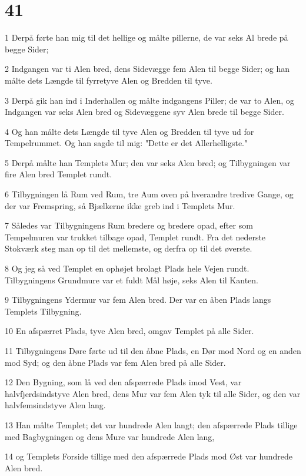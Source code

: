 \chapter{41}

\par 1 Derpå førte han mig til det hellige og målte pillerne, de var seks Al brede på begge Sider;
\par 2 Indgangen var ti Alen bred, dens Sidevægge fem Alen til begge Sider; og han målte dets Længde til fyrretyve Alen og Bredden til tyve.
\par 3 Derpå gik han ind i Inderhallen og målte indgangens Piller; de var to Alen, og Indgangen var seks Alen bred og Sidevæggene syv Alen brede til begge Sider.
\par 4 Og han målte dets Længde til tyve Alen og Bredden til tyve ud for Tempelrummet. Og han sagde til mig: "Dette er det Allerhelligste."
\par 5 Derpå målte han Templets Mur; den var seks Alen bred; og Tilbygningen var fire Alen bred Templet rundt.
\par 6 Tilbygningen lå Rum ved Rum, tre Aum oven på hverandre tredive Gange, og der var Fremspring, så Bjælkerne ikke greb ind i Templets Mur.
\par 7 Således var Tilbygningens Rum bredere og bredere opad, efter som Tempelmuren var trukket tilbage opad, Templet rundt. Fra det nederste Stokværk steg man op til det mellemste, og derfra op til det øverste.
\par 8 Og jeg så ved Templet en ophøjet brolagt Plads hele Vejen rundt. Tilbygningens Grundmure var et fuldt Mål høje, seks Alen til Kanten.
\par 9 Tilbygningens Ydermur var fem Alen bred. Der var en åben Plads langs Templets Tilbygning.
\par 10 En afspærret Plads, tyve Alen bred, omgav Templet på alle Sider.
\par 11 Tilbygningens Døre førte ud til den åbne Plads, en Dør mod Nord og en anden mod Syd; og den åbne Plads var fem Alen bred på alle Sider.
\par 12 Den Bygning, som lå ved den afspærrede Plads imod Vest, var halvfjerdsindstyve Alen bred, dens Mur var fem Alen tyk til alle Sider, og den var halvfemsindstyve Alen lang.
\par 13 Han målte Templet; det var hundrede Alen langt; den afspærrede Plads tillige med Bagbygningen og dens Mure var hundrede Alen lang,
\par 14 og Templets Forside tillige med den afspærrede Plads mod Øst var hundrede Alen bred.
